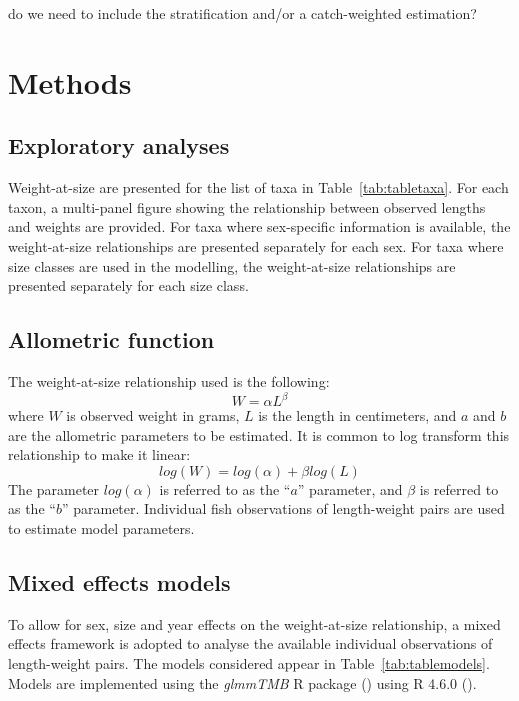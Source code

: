 \documentclass[12pt]{article}\usepackage[]{graphicx}\usepackage[]{color}
\begin{document}
do we need to include the stratification and/or a catch-weighted estimation?

\section{Methods}\label{methods}

\subsection{Exploratory analyses}\label{exploratory-analyses}

Weight-at-size are presented for the list of taxa in Table~\ref{tab:tabletaxa}. For each taxon, a multi-panel figure showing the relationship between observed lengths and weights are provided. For taxa where sex-specific information is available, the weight-at-size relationships are presented separately for each sex. For taxa where size classes are used in the modelling, the weight-at-size relationships are presented separately for each size class.

\subsection{Allometric function}\label{allometric-function}

The weight-at-size relationship used is the following: \begin{equation}
W = \alpha L^{\beta}
\end{equation} where \(W\) is observed weight in grams, \(L\) is the length in centimeters, and \(a\) and \(b\) are the allometric parameters to be estimated. It is common to log transform this relationship to make it linear: \begin{equation}
log(W) = log(\alpha) +  \beta log(L)
\end{equation} The parameter \(log(\alpha)\) is referred to as the ``\(a\)'' parameter, and \(\beta\) is referred to as the ``\(b\)'' parameter.
Individual fish observations of length-weight pairs are used to estimate model parameters.

\subsection{Mixed effects models}\label{mixed-effects-models}

To allow for sex, size and year effects on the weight-at-size relationship, a mixed effects framework is adopted to analyse the available individual observations of length-weight pairs. The models considered appear in Table~\ref{tab:tablemodels}. Models are implemented using the \emph{glmmTMB} R package () using R 4.6.0 ().
\end{document}
